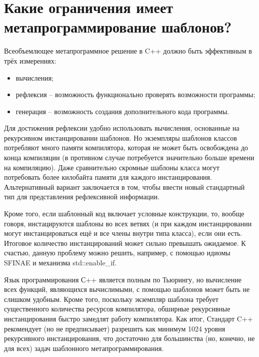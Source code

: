\documentclass[a4paper,12pt]{article}	%
\begin{document}
\newpage

\section{Какие ограничения имеет метапрограммирование шаблонов?}

	Всеобъемлющее метапрограммное решение в C++ должно быть эффективным в трёх измерениях:
	
	\begin{itemize}
	
		\item вычисления;
		
		\item рефлексия -- возможность функционально проверять возможности программы;
		
		\item генерация -- возможность создания дополнительного кода программы.
	
	\end{itemize}
	
	Для достижения рефлексии удобно использовать вычисления, основанные на рекурсивном инстанцировании шаблонов. Но экземпляры шаблонов классов потребляют много памяти компилятора, которая не может быть освобождена до конца компиляции (в противном случае потребуется значительно больше времени на компиляцию). Даже сравнительно скромные шаблоны класса могут потребовать более килобайта памяти для каждого инстанцирования. Альтернативный вариант заключается в том, чтобы ввести новый стандартный тип для представления рефлексивной информации.
	
	Кроме того, если шаблонный код включает условные конструкции, то, вообще говоря, инстацируются шаблоны во всех ветвях (и при каждом инстанцировании могут инстанцироваться ещё и все члены внутри типа класса), если они есть. Итоговое количество инстанцирований может сильно превышать ожидаемое. К счастью, данную проблему можно решить, например, с помощью идиомы SFINAE и механизма std::enable\_if.
	
	Язык программирования С++ является полным по Тьюрингу, но вычисление всех функций, являющихся вычислимыми, с помощью шаблонов может быть не слишком удобным. Кроме того, поскольку экземпляр шаблона требует существенного количества ресурсов компилятора, обширные рекурсивные инстанцирования быстро замедлят работу компилятора. Как итог, Стандарт C++ рекомендует (но не предписывает) разрешить как минимум 1024 уровня рекурсивного инстанцирования, что достаточно для большинства (но, конечно, не для всех) задач шаблонного метапрограммирования.
	
\end{document}
